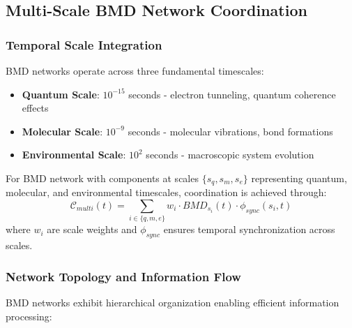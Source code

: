 ﻿\documentclass[11pt,a4paper]{article}
\begin{document}
\subsection{Multi-Scale BMD Network Coordination}

\subsubsection{Temporal Scale Integration}

BMD networks operate across three fundamental timescales:

\begin{itemize}
\item \textbf{Quantum Scale}: $10^{-15}$ seconds - electron tunneling, quantum coherence effects
\item \textbf{Molecular Scale}: $10^{-9}$ seconds - molecular vibrations, bond formations
\item \textbf{Environmental Scale}: $10^{2}$ seconds - macroscopic system evolution
\end{itemize}

\begin{definition}
For BMD network with components at scales $\{s_q, s_m, s_e\}$ representing quantum, molecular, and environmental timescales, coordination is achieved through:
\begin{equation}
\mathcal{C}_{multi}(t) = \sum_{i \in \{q,m,e\}} w_i \cdot BMD_{s_i}(t) \cdot \phi_{sync}(s_i, t)
\end{equation}
where $w_i$ are scale weights and $\phi_{sync}$ ensures temporal synchronization across scales.
\end{definition}

\subsubsection{Network Topology and Information Flow}

BMD networks exhibit hierarchical organization enabling efficient information processing:
\end{document}
